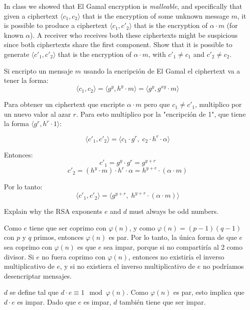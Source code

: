 \documentclass[12pt,addpoints,answers]{exam}
\begin{document}
\begin{questions}
\question[10] In class we showed that El Gamal encryption is {\em malleable}, and specifically that given a ciphertext $\langle c_1,c_2\rangle$ that is the encryption of some unknown message $m$, it is possible to produce a ciphertext $\langle c_1,c'_2\rangle$ that is the encryption of $\alpha\cdot m$ (for known $\alpha$). A receiver who receives both these ciphertexts might be suspicious since both ciphertexts share the first component. Show that it is possible to generate $\langle c'_1,c'_2\rangle$ that is the encryption of $\alpha\cdot m$, with $c'_1\neq c_1$ and $c'_2\neq c_2$.
\begin{solution}
    Si encripto un mensaje $m$ usando la encripción de El Gamal el ciphertext va a tener la forma: 
    \[
        \langle c_1,c_2\rangle = \langle g^y,h^y \cdot m\rangle = \langle g^y,g^{xy} \cdot m\rangle
    \]

    Para obtener un ciphertext que encripte $\alpha \cdot m$ pero que $c_1 \neq c'_1$, multiplico por un nuevo valor al azar $r$. 
    Para esto multiplico por la "encripción de 1", que tiene la forma $\langle g^r, h^r \cdot 1 \rangle$:

    \[
        \langle c'_1,c'_2\rangle = \langle c_1 \cdot g^r,\; c_2 \cdot h^r \cdot \alpha \rangle
    \]

    Entonces:
    \[
        c'_1 = g^y \cdot g^r = g^{y+r}
    \]
    \[
        c'_2 = (h^y \cdot m)\cdot h^r \cdot \alpha = h^{y+r} \cdot (\alpha \cdot m)
    \]

    Por lo tanto:
    \[
        \langle c'_1,c'_2\rangle = \langle g^{y+r},\; h^{y+r} \cdot (\alpha \cdot m)\rangle
    \]
\end{solution}


\question[10] Explain why the RSA exponents $e$ and $d$ must always be odd numbers.
\begin{solution}
    Como $e$ tiene que ser coprimo con $\varphi(n)$, y como $\varphi(n) = (p-1)(q-1)$ con $p$ y $q$ primos, entonces $\varphi(n)$ es par. Por lo tanto, la única forma de que $e$ sea coprimo con $\varphi(n)$ es que $e$ sea impar, porque si no compartiría al 2 como divisor. Si $e$ no fuera coprimo con $\varphi(n)$, entonces no existiría el inverso multiplicativo de $e$, y si no existiera el inverso multiplicativo de $e$ no podríamos desencriptar mensajes. 

    $d$ se define tal que $d \cdot e \equiv 1 \mod \varphi(n)$. Como $\varphi(n)$ es par, esto implica que $d \cdot e$ es impar. Dado que $e$ es impar, $d$ también tiene que ser impar.
\end{solution}



\end{questions}
\end{document}
